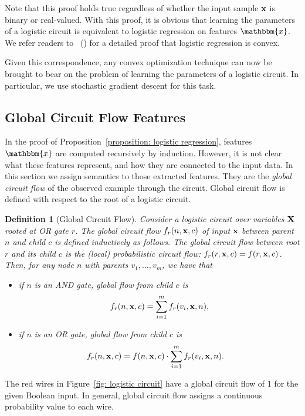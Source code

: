 \documentclass[letterpaper]{article} %
\newtheorem{definition}{Definition}
\newcommand{\sample}{{\bf x}}
\newcommand{\citet}[1]{\citeauthor{#1}~(\citeyear{#1})}
\begin{document}
Note that this proof holds true regardless of whether the input sample ${\bf x}$ is binary or real-valued.
With this proof, it is obvious that learning the parameters of a logistic circuit is equivalent to logistic regression on features $\mathbbm{x}$. 
We refer readers to \citet{Rennie2005} for a detailed proof that logistic regression is convex. 

Given this correspondence, any convex optimization technique can now be brought to bear on the problem of learning the parameters of a logistic circuit. In particular, we use stochastic gradient descent for this task.


\subsection{Global Circuit Flow Features}

In the proof of Proposition~\ref{proposition: logistic regression}, features $\mathbbm{x}$  are computed recursively by induction. However, it is not clear what these features represent, and how they are connected to the input data. In this section we assign semantics to those extracted features. They are the \emph{global circuit flow} of the observed example through the circuit. Global circuit flow is defined with respect to the root of a logistic circuit.

\begin{definition}[Global Circuit Flow]
    \label{definition: global flow}
    Consider a logistic circuit over variables $\bf X$ rooted at OR gate $r$.  
    The global circuit flow $f_r(n, \sample, c)$ of input $\sample $ between parent $n$ and child $c$ is defined inductively as follows.
    The global circuit flow between root $r$ and its child $c$ is the (local) probabilistic circuit flow: $f_r(r, \sample, c) = f(r, \sample, c)$.
    Then, for any node $n$ with parents $v_1,\dots,v_m$, we have that
    \begin{itemize}
        \item[--] if $n$ is an AND gate, global flow from child $c$ is
        \begin{align*}
            f_r(n, \sample, c) = \sum_{i=1}^m f_r(v_i, \sample, n),
        \end{align*}
        \item[--] if $n$ is an OR gate, global flow from child $c$ is
        \begin{align*}
            f_r(n, \sample, c) &=  f(n, \sample,c) \cdot \sum_{i=1}^m  f_r(v_i, \sample, n).
        \end{align*}
    \end{itemize}
\end{definition}
The red wires in Figure~\ref{fig: logistic circuit} have a global circuit flow of 1 for the given Boolean input. In general, global circuit flow assigns a continuous probability value to each wire.
\end{document}
